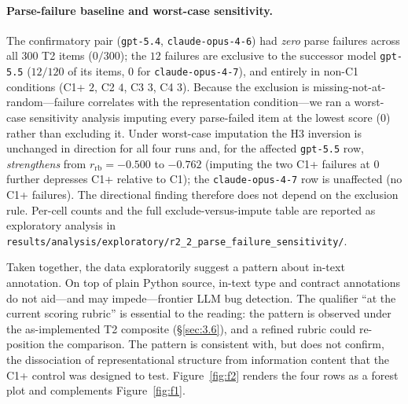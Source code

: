\documentclass[11pt]{article}
\begin{document}
\paragraph{Parse-failure baseline and worst-case sensitivity.}
The confirmatory pair (\texttt{gpt-5.4}, \texttt{claude-opus-4-6})
had \emph{zero} parse failures across all $300$ T2 items
($0/300$); the $12$ failures are exclusive to the successor model
\texttt{gpt-5.5} ($12/120$ of its items, $0$ for
\texttt{claude-opus-4-7}), and entirely in non-C1 conditions
(C1+ $2$, C2 $4$, C3 $3$, C4 $3$). Because the exclusion is
missing-not-at-random---failure correlates with the representation
condition---we ran a worst-case sensitivity analysis imputing every
parse-failed item at the lowest score ($0$) rather than excluding
it. Under worst-case imputation the H3 inversion is unchanged in
direction for all four runs and, for the affected
\texttt{gpt-5.5} row, \emph{strengthens} from $r_{\text{rb}} =
-0.500$ to $-0.762$ (imputing the two C1+ failures at $0$ further
depresses C1+ relative to C1); the \texttt{claude-opus-4-7} row is
unaffected (no C1+ failures). The directional finding therefore does
not depend on the exclusion rule. Per-cell counts and the full
exclude-versus-impute table are reported as exploratory analysis in
\texttt{results/analysis/exploratory/r2\_2\_parse\_failure\_sensitivity/}.

Taken together, the data exploratorily suggest a pattern about
in-text annotation. On top of plain Python source, in-text type
and contract annotations do not aid---and may impede---frontier
LLM bug detection. The qualifier ``at the current scoring
rubric'' is essential to the reading: the pattern is observed
under the as-implemented T2 composite (\S\ref{sec:3.6}), and a
refined rubric could re-position the comparison. The pattern is
consistent with, but does not confirm, the dissociation of
representational structure from information content that the
C1+ control was designed to test. Figure~\ref{fig:f2} renders
the four rows as a forest plot and complements
Figure~\ref{fig:f1}.
\end{document}
